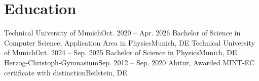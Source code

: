 \section{Education}
  \resumeSubHeadingListStart
    \resumeSubheading
      {Technical University of Munich}{Oct. 2020 -- Apr. 2026}
      {Bachelor of Science in Computer Science, Application Area in Physics}{Munich, DE}
    \resumeSubheading
      {Technical University of Munich}{Oct. 2024 -- Sep. 2025}
      {Bachelor of Science in Physics}{Munich, DE}
    \resumeSubheading
      {Herzog-Christoph-Gymnasium}{Sep. 2012 -- Sep. 2020}
      {Abitur, Awarded MINT-EC certificate with distinction}{Beilstein, DE}
  \resumeSubHeadingListEnd
